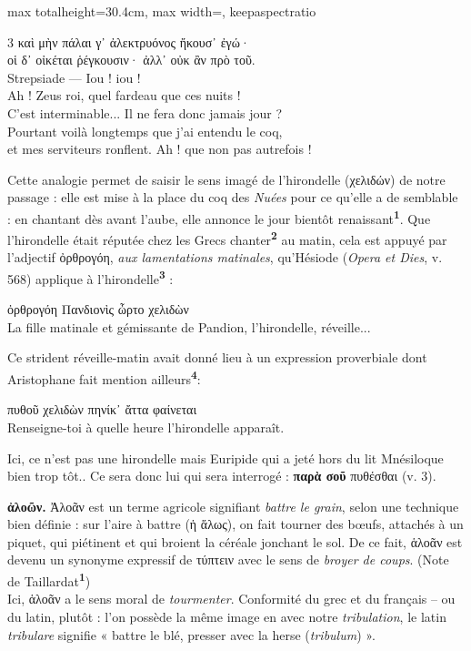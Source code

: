 \documentclass[11pt,twoside]{book}
\newcommand{\italique}[1]{\textit{#1}}
\newcommand{\citComm}[1]{\begin{quoting}[vskip=0.4pt,leftmargin=0.7em,rightmargin=0.2em]#1\end{quoting}}
\newcommand{\grec}[1]{{\policeGr #1}}
\newcommand{\latin}[1]{\textit{#1}}
\newcommand{\marqueur}[1]{\textsuperscript{\color{rubricRed}\textbf{#1}}}
\begin{document}
\begin{adjustbox}{max totalheight=30.4cm, max width=\textwidth, keepaspectratio}
\begin{minipage}{\textwidth}
{\begin{multicols}{3}
{καὶ μὴν πάλαι γ᾽ ἀλεκτρυόνος ἤκουσ᾽ ἐγώ·\\
οἱ δ᾽ οἰκέται ῥέγκουσιν· ἀλλ᾽ οὐκ ἂν πρὸ τοῦ.\\
Strepsiade --- Iou ! iou !\\
Ah ! Zeus roi, quel fardeau que ces nuits !\\
C'est interminable... Il ne fera donc jamais jour ?\\
Pourtant voilà longtemps que j'ai entendu le coq,\\
et mes serviteurs ronflent. Ah ! que non pas autrefois !}
\par\vspace{1.5pt}
\noindent Cette analogie permet de saisir le sens imagé de l'hirondelle (χελιδών) de notre passage : elle est mise à la place du coq des \italique{Nuées} pour ce qu'elle a de semblable : en chantant dès avant l'aube, elle annonce le jour bientôt renaissant\marqueur{1}. Que l'hirondelle était réputée chez les Grecs chanter\marqueur{2} au matin, cela est appuyé par l'adjectif ὀρθρογόη, \italique{aux lamentations matinales}, qu'Hésiode (\italique{Opera et Dies}, v. 568) applique à l'hirondelle\marqueur{3} :
\citComm{ὀρθρογόη Πανδιονὶς ὦρτο χελιδὼν\\
La fille matinale et gémissante de Pandion, l'hirondelle, réveille...}
\par\vspace{1.5pt}
\noindent Ce strident réveille-matin avait donné lieu à un expression proverbiale dont Aristophane fait mention ailleurs\marqueur{4}:
\citComm{πυθοῦ χελιδὼν πηνίκ᾽ ἄττα φαίνεται\\
Renseigne-toi à quelle heure l'hirondelle apparaît.}
\par\vspace{1.5pt}
\noindent Ici, ce n'est pas une hirondelle mais Euripide qui a jeté hors du lit Mnésiloque bien trop tôt.. Ce sera donc lui qui sera interrogé : \textbf{παρὰ σοῦ} πυθέσθαι (v. 3).
\par\vspace{1.5pt}
 \textbf{ἀλοῶν.} Ἀλοᾶν est un terme agricole signifiant \italique{battre le grain}, selon une technique bien définie : sur l'aire à battre (ἡ ἅλως), on fait tourner des bœufs, attachés à un piquet, qui piétinent et qui broient la céréale jonchant le sol. De ce fait, ἁλοᾶν est devenu un synonyme expressif de \grec{τύπτειν} avec le sens de \italique{broyer de coups}. (Note de Taillardat\marqueur{1})\\ Ici, ἁλοᾶν a le sens moral de \italique{tourmenter}. Conformité du grec et du français -- ou du latin, plutôt : l'on possède la même image en avec notre \italique{tribulation}, le latin \latin{tribulare} signifie « battre le blé, presser avec la herse (\latin{tribulum}) ».

\end{multicols}}
\end{minipage}
\end{adjustbox}
\end{document}
